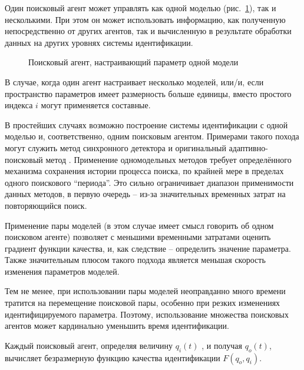 Один поисковый агент может управлять как одной моделью (рис.~\ref{atu:f:agent1}),
так и несколькими.
При этом он может использовать информацию,
как полученную непосредственно от других агентов,
так и вычисленную в результате обработки данных на других уровнях системы идентификации.

\begin{figure}[htb!]
\begin{center}

\end{center}
\caption{Поисковый агент, настраивающий параметр одной модели}
\label{atu:f:agent1}
\end{figure}


В случае, когда один агент настраивает несколько моделей,
или/и, если пространство параметров имеет размерность больше единицы,
вместо простого индекса $i$ могут применяется составные.

В простейших случаях возможно построение системы идентификации
с одной моделью и, соответственно, одним поисковым агентом.
Примерами такого похода могут служить
метод синхронного детектора \cite{adopt_cont_sys}
и оригинальный адаптивно-поисковый метод \cite{mich_92}.
Применение одномодельных методов требует определённого механизма
сохранения истории процесса поиска, по крайней мере в пределах
одного поискового ``периода''. Это сильно ограничивает диапазон
применимости данных методов, в первую очередь -- из-за значительных
временных затрат на повторяющийся поиск.

Применение пары моделей \cite{atu_asau3}
(в этом случае имеет смысл говорить об одном поисковом агенте)
позволяет с меньшими временными затратами оценить градиент функции качества,
и, как следствие -- определить значение параметра. Также значительным плюсом
такого подхода является меньшая скорость изменения параметров моделей.

Тем не менее, при использовании пары моделей неоправданно много времени
тратится на перемещение поисковой пары, особенно при резких изменениях
идентифицируемого параметра. Поэтому, использование множества
поисковых агентов может кардинально уменьшить время идентификации.

Каждый поисковый агент, определяя величину $q_{i}(t)$ , и получая $q_o(t)$,
вычисляет безразмерную функцию качества идентификации
$F(q_o,q_i)$.

